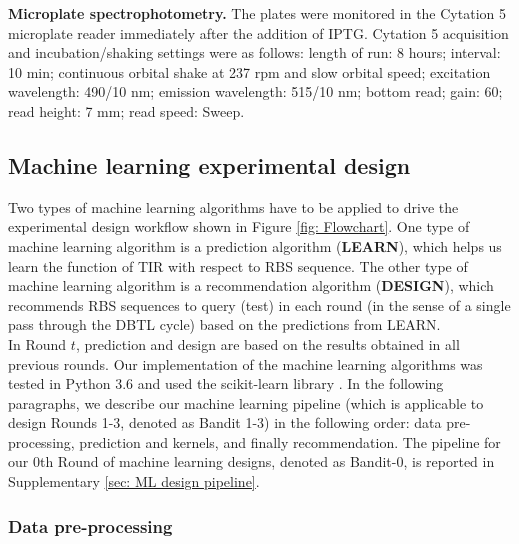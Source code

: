 \documentclass{scrartcl}[2013/05/29]%
\begin{document}
\textbf{Microplate spectrophotometry.}
The plates were monitored in the Cytation 5 microplate reader immediately after the addition of IPTG.
Cytation 5 acquisition and incubation/shaking settings were as follows: length of run: 8 hours; interval: 10 min; continuous orbital shake at 237 rpm and slow orbital speed; excitation wavelength: 490/10 nm; emission wavelength: 515/10 nm; bottom read; gain: 60; read height: 7 mm; read speed: Sweep.

\subsection{Machine learning experimental design}

Two types of machine learning algorithms have to be applied to drive the experimental design workflow shown in Figure \ref{fig: Flowchart}.
One type of machine learning algorithm is a prediction algorithm (\textbf{LEARN}), which helps us learn the function of TIR with respect to RBS sequence. The other type of machine learning algorithm is a recommendation algorithm (\textbf{DESIGN}), which recommends RBS sequences to query (test) in each round (in the sense of a single pass through the DBTL cycle) based on the predictions from LEARN. \\

In Round $t$, prediction and design are based on the results obtained in all previous rounds. 
Our implementation of the machine learning algorithms was tested in Python 3.6 and used the scikit-learn library \cite{scikit-learn}. 
In the following paragraphs, we describe our machine learning pipeline (which is applicable to design Rounds 1-3, denoted as Bandit 1-3) in the following order: data pre-processing, prediction and kernels, and finally recommendation. 
The pipeline for our 0th Round of machine learning designs, denoted as Bandit-0, is reported in Supplementary \ref{sec: ML design pipeline}.


\subsubsection{Data pre-processing}
\label{sec: method data pre-procesing}
\end{document}
